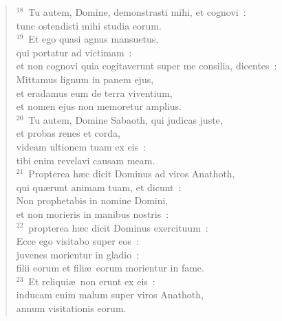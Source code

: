 \begin{verse}${}^{18}$~Tu autem, Domine, demonstrasti mihi, et cognovi~:\\ tunc ostendisti mihi studia eorum.\\
${}^{19}$~Et ego quasi agnus mansuetus,\\ qui portatur ad victimam~:\\ et non cognovi quia cogitaverunt super me consilia, dicentes~:\\ Mittamus lignum in panem ejus,\\ et eradamus eum de terra viventium,\\ et nomen ejus non memoretur amplius.\\
${}^{20}$~Tu autem, Domine Sabaoth, qui judicas juste,\\ et probas renes et corda,\\ videam ultionem tuam ex eis~:\\ tibi enim revelavi causam meam.\\
${}^{21}$~Propterea h\ae c dicit Dominus ad viros Anathoth,\\ qui qu\ae runt animam tuam, et dicunt~:\\ Non prophetabis in nomine Domini,\\ et non morieris in manibus nostris~:\\
${}^{22}$~propterea h\ae c dicit Dominus exercituum~:\\ Ecce ego visitabo super eos~:\\ juvenes morientur in gladio~;\\ filii eorum et fili\ae\ eorum morientur in fame.\\
${}^{23}$~Et reliqui\ae\ non erunt ex eis~:\\ inducam enim malum super viros Anathoth,\\ annum visitationis eorum.\end{verse}


